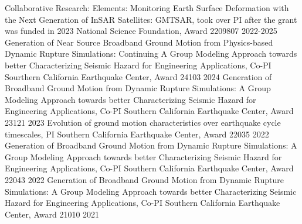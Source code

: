 \begin{cvhonors}
\vspace{3em} %
\cvhonor
    {Collaborative Research: Elements: Monitoring Earth Surface Deformation with the Next Generation of InSAR Satellites: GMTSAR, took over PI after the grant was funded in 2023} %
    {National Science Foundation, Award 2209807} %
    {} %
    {2022-2025} %
\vspace{4em} %
\cvhonor
    {Generation of Near Source Broadband Ground Motion from Physics-based Dynamic Rupture Simulations: Continuing A Group Modeling Approach towards better Characterizing Seismic Hazard for Engineering Applications, Co-PI} %
    {Sourthern California Earthquake Center, Award 24103} %
    {} %
    {2024} %
\vspace{2.5em}
\cvhonor
    {Generation of Broadband Ground Motion from Dynamic Rupture Simulations: A Group Modeling Approach towards better Characterizing Seismic Hazard for Engineering Applications, Co-PI} %
    {Southern California Earthquake Center, Award 23121} %
    {} %
    {2023} %
\vspace{1.5em} 
\cvhonor
    {Evolution of ground motion characteristics over earthquake cycle timescales, PI} %
    {Southern California Earthquake Center, Award 22035} %
    {} %
    {2022} %
\vspace{2.5em} 
\cvhonor
    {Generation of Broadband Ground Motion from Dynamic Rupture Simulations: A Group Modeling Approach towards better Characterizing Seismic Hazard for Engineering Applications, Co-PI} %
    {Southern California Earthquake Center, Award 22043} %
    {} %
    {2022} %
\vspace{2.5em} %
\cvhonor
    {Generation of Broadband Ground Motion from Dynamic Rupture Simulations: A Group Modeling Approach towards better Characterizing Seismic Hazard for Engineering Applications, Co-PI} %
    {Southern California Earthquake Center, Award 21010} %
    {} %
    {2021} %
\end{cvhonors}
